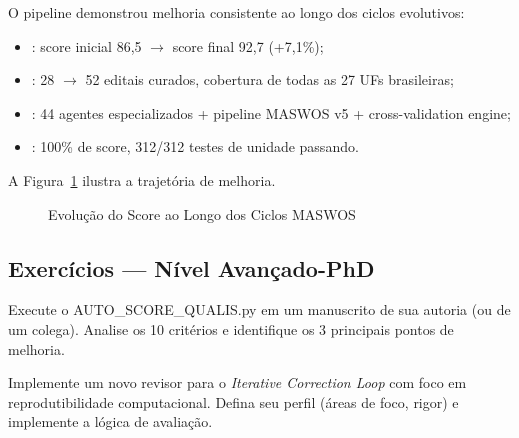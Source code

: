 O pipeline demonstrou melhoria consistente ao longo dos ciclos
evolutivos:

\begin{itemize}
\item {}: score inicial 86,5 $\to$ score final 92,7
(+7,1\%);
\item {}: 28 $\to$ 52 editais curados, cobertura de
todas as 27 UFs brasileiras;
\item {}: 44 agentes especializados + pipeline
MASWOS v5 + cross-validation engine;
\item {}: 100\% de score, 312/312 testes de unidade
passando.
\end{itemize}

A Figura~\ref{fig:evolucao-score} ilustra a trajetória de melhoria.

\begin{figure}[htb]
\centering
\caption{Evolução do Score ao Longo dos Ciclos MASWOS}
\label{fig:evolucao-score}
\end{figure}

\subsection{Exercícios — Nível Avançado-PhD}

\begin{exercicio}
Execute o AUTO\_SCORE\_QUALIS.py em um manuscrito de sua autoria
(ou de um colega). Analise os 10 critérios e identifique os 3
principais pontos de melhoria.
\end{exercicio}

\begin{exercicio}
Implemente um novo revisor para o \textit{Iterative Correction Loop}
com foco em reprodutibilidade computacional. Defina seu perfil
(áreas de foco, rigor) e implemente a lógica de avaliação.
\end{exercicio}


